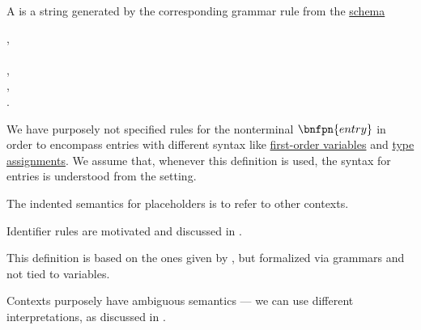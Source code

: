 \begin{definition}\label{def:logical_context}\mimprovised
  A  is a string generated by the corresponding grammar rule from the \hyperref[def:formal_grammar/schema]{schema}
  \begin{bnf*}
           {}, \\
      { \bnfor {} \bnfor} \\
    , \\
         {\bnfes}, \\
               { \bnfor {}}.
  \end{bnf*}
\end{definition}
\begin{comments}
  \item We have purposely not specified rules for the nonterminal \( \bnfpn{entry} \) in order to encompass entries with different syntax like \hyperref[def:first_order_syntax/var]{first-order variables} and \hyperref[def:type_assignments]{type assignments}. We assume that, whenever this definition is used, the syntax for entries is understood from the setting.
  \item The indented semantics for placeholders is to refer to other contexts.
  \item Identifier rules are motivated and discussed in .
  \item This definition is based on the ones given by \cite[45; 159]{Mimram2020}, but formalized via grammars and not tied to variables.
  \item Contexts purposely have ambiguous semantics --- we can use different interpretations, as discussed in .
\end{comments}

